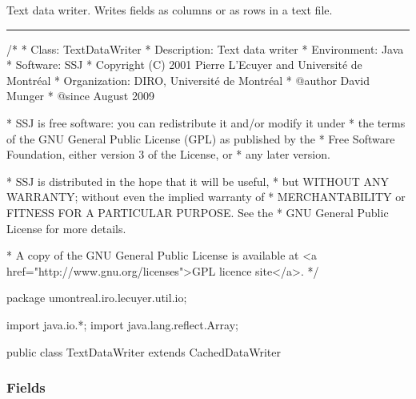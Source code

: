 
Text data writer. Writes fields as columns or as rows in a text file.

\bigskip\hrule

\begin{code}
\begin{hide}
/*
 * Class:        TextDataWriter
 * Description:  Text data writer
 * Environment:  Java
 * Software:     SSJ 
 * Copyright (C) 2001  Pierre L'Ecuyer and Université de Montréal
 * Organization: DIRO, Université de Montréal
 * @author       David Munger 
 * @since        August 2009

 * SSJ is free software: you can redistribute it and/or modify it under
 * the terms of the GNU General Public License (GPL) as published by the
 * Free Software Foundation, either version 3 of the License, or
 * any later version.

 * SSJ is distributed in the hope that it will be useful,
 * but WITHOUT ANY WARRANTY; without even the implied warranty of
 * MERCHANTABILITY or FITNESS FOR A PARTICULAR PURPOSE.  See the
 * GNU General Public License for more details.

 * A copy of the GNU General Public License is available at
   <a href="http://www.gnu.org/licenses">GPL licence site</a>.
 */
\end{hide}
package umontreal.iro.lecuyer.util.io;
\begin{hide}
import java.io.*;
import java.lang.reflect.Array;
\end{hide}

public class TextDataWriter extends CachedDataWriter \begin{hide} {
\end{hide}
\end{code}


\subsubsection*{Fields}


